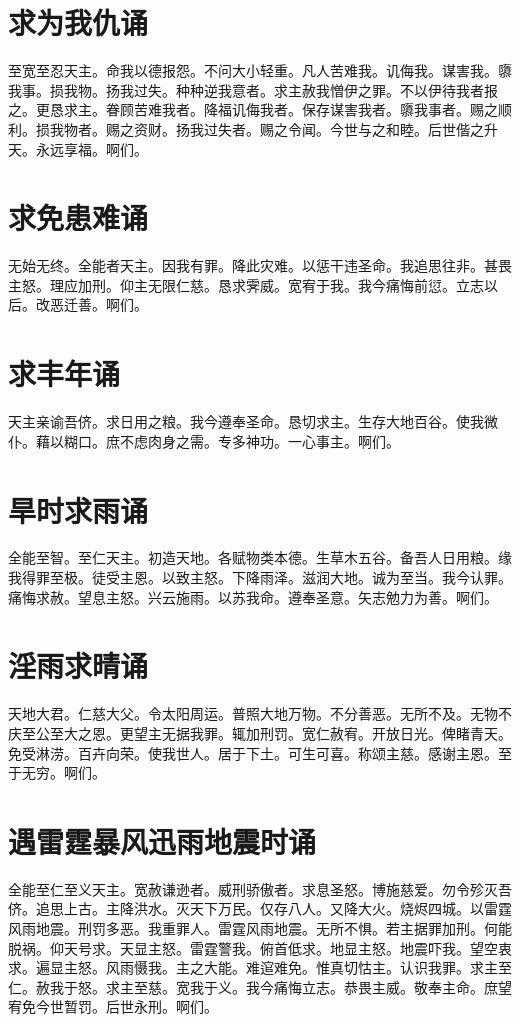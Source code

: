\documentclass[UTF8,17pt]{ctexart}
\begin{document}
\section{求为我仇诵}

⾄宽⾄忍天主。命我以德报怨。不问⼤⼩轻重。凡⼈苦难我。讥侮我。谋害我。隳我事。损我物。扬我过失。种种逆我意者。求主赦我憎伊之罪。不以伊待我者报之。更恳求主。眷顾苦难我者。降福讥侮我者。保存谋害我者。隳我事者。赐之顺利。损我物者。赐之资财。扬我过失者。赐之令闻。今世与之和睦。后世偕之升天。永远享福。啊们。

\section{求免患难诵}

⽆始⽆终。全能者天主。因我有罪。降此灾难。以惩⼲违圣命。我追思往⾮。甚畏主怒。理应加刑。仰主⽆限仁慈。恳求霁威。宽宥于我。我今痛悔前愆。⽴志以后。改恶迁善。啊们。

\section{求丰年诵}

天主亲谕吾侪。求⽇⽤之粮。我今遵奉圣命。恳切求主。⽣存⼤地百⾕。使我微仆。藉以糊口。庶不虑⾁⾝之需。专多神功。⼀⼼事主。啊们。

\section{旱时求⾬诵}

全能⾄智。⾄仁天主。初造天地。各赋物类本德。⽣草⽊五⾕。备吾⼈⽇⽤粮。缘我得罪⾄极。徒受主恩。以致主怒。下降⾬泽。滋润⼤地。诚为⾄当。我今认罪。痛悔求赦。望息主怒。兴云施⾬。以苏我命。遵奉圣意。⽮志勉⼒为善。啊们。

\section{淫⾬求晴诵}

天地⼤君。仁慈⼤⽗。令太阳周运。普照⼤地万物。不分善恶。⽆所不及。⽆物不庆⾄公⾄⼤之恩。更望主⽆据我罪。辄加刑罚。宽仁赦宥。开放⽇光。俾睹青天。免受淋涝。百卉向荣。使我世⼈。居于下⼟。可⽣可喜。称颂主慈。感谢主恩。⾄于⽆穷。啊们。

\section{遇雷霆暴风迅⾬地震时诵}

全能⾄仁⾄义天主。宽赦谦逊者。威刑骄傲者。求息圣怒。博施慈爱。勿令殄灭吾侪。追思上古。主降洪⽔。灭天下万民。仅存⼋⼈。又降⼤⽕。烧烬四城。以雷霆风⾬地震。刑罚多恶。我重罪⼈。雷霆风⾬地震。⽆所不惧。若主据罪加刑。何能脱祸。仰天号求。天显主怒。雷霆警我。俯⾸低求。地显主怒。地震吓我。望空衷求。遍显主怒。风雨慑我。主之⼤能。难逭难免。惟真切怙主。认识我罪。求主⾄仁。赦我于怒。求主⾄慈。宽我于义。我今痛悔⽴志。恭畏主威。敬奉主命。庶望宥免今世暂罚。后世永刑。啊们。
\end{document}
